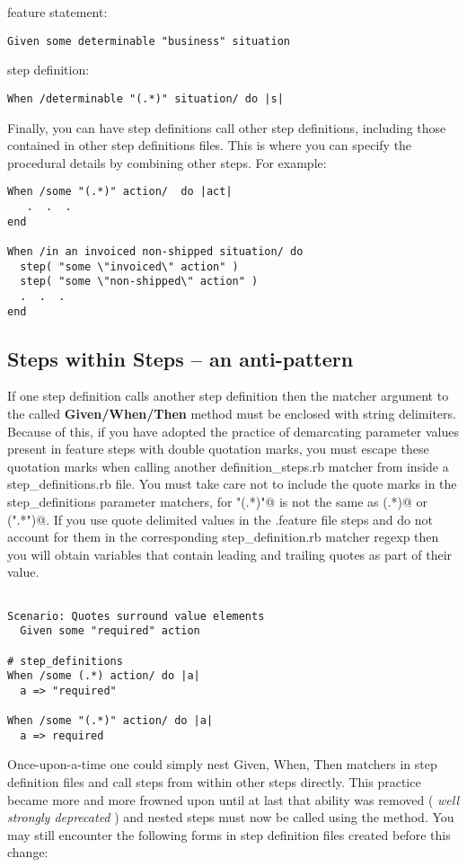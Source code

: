 \documentclass[10pt]{book}
\begin{document}
feature statement:
\begin{verbatim}
Given some determinable "business" situation

\end{verbatim}

step definition:
\begin{verbatim}
When /determinable "(.*)" situation/ do |s|

\end{verbatim}

Finally, you can have step definitions call other step definitions, including those contained in other step definitions files.  This is where you can specify the procedural details by combining other steps. For example:

\begin{verbatim}
When /some "(.*)" action/  do |act|
   .  .  .
end

When /in an invoiced non-shipped situation/ do
  step( "some \"invoiced\" action" )
  step( "some \"non-shipped\" action" )
  .  .  .
end

\end{verbatim}
\subsection{Steps within Steps -- an anti-pattern}

If one step definition calls another step definition then the matcher argument to the called \textbf{Given/When/Then} method must be enclosed with string delimiters.  Because of this, if you have adopted the practice of demarcating parameter values present in feature steps with double quotation marks, you must escape these quotation marks when calling another definition\_steps.rb matcher from inside a step\_definitions.rb file.  You must take care not to include the quote marks in the step\_definitions parameter matchers, for \verb@"(.*)"@ is not the same as \verb@(.*)@ or \verb@(".*")@.  If you use quote delimited values in the .feature file steps and do not account for them in the corresponding step\_definition.rb matcher regexp then you will obtain variables that contain leading and trailing quotes as part of their value.

\begin{verbatim}

Scenario: Quotes surround value elements
  Given some "required" action

# step_definitions
When /some (.*) action/ do |a|
  a => "required"

When /some "(.*)" action/ do |a|
  a => required

\end{verbatim}
Once-upon-a-time one could simply nest Given, When, Then matchers in step definition files and call steps from within other steps directly.  This practice became more and more frowned upon until at last that ability was removed ( \emph{well strongly deprecated} ) and nested steps must now be called using the \textbf{\verb@step@} method.  You may still encounter the following forms in step definition files created before this change:
\end{document}
